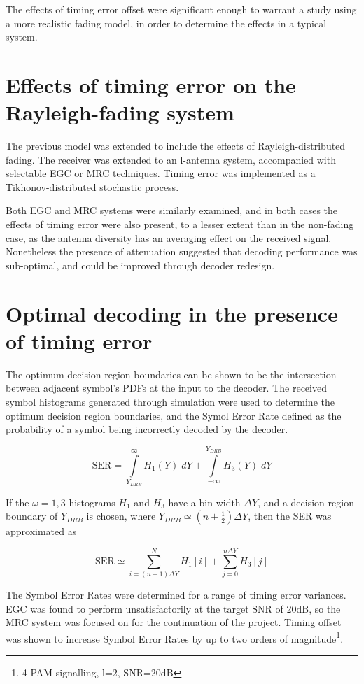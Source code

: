 The effects of timing error offset were significant enough to warrant a study using a more realistic fading model, in order to determine the effects in a typical system.

\section{Effects of timing error on the Rayleigh-fading system}

The previous model was extended to include the effects of Rayleigh-distributed fading. The receiver was extended to an l-antenna system, accompanied with selectable EGC or MRC techniques. Timing error was implemented as a Tikhonov-distributed stochastic process.

Both EGC and MRC systems were similarly examined, and in both cases the effects of timing error were also present, to a lesser extent than in the non-fading case, as the antenna diversity has an averaging effect on the received signal. Nonetheless the presence of attenuation suggested that decoding performance was sub-optimal, and could be improved through decoder redesign.

\section{Optimal decoding in the presence of timing error}

The optimum decision region boundaries can be shown to be the intersection between adjacent symbol's PDFs at the input to the decoder. The received symbol histograms generated through simulation were used to determine the optimum decision region boundaries, and the Symol Error Rate defined as the probability of a symbol being incorrectly decoded by the decoder.

\[
\text{SER} = \int\limits_{Y_{DRB}}^{\infty} H_1 (Y) \; dY + \int\limits_{- \infty}^{Y_{DRB}} H_3 (Y) \; dY
\]

If the $\omega = 1, 3$ histograms $H_1$ and $H_3$ have a bin width $\Delta Y$, and a decision region boundary of $Y_{DRB}$ is chosen, where $Y_{DRB} \simeq (n + \frac{1}{2}) \Delta Y$, then the SER was approximated as

\[
\text{SER} \simeq \sum\limits_{i = (n+1) \Delta Y}^{N} H_1 [i] + \sum\limits_{j = 0}^{n \Delta Y} H_3 [j]
\]

The Symbol Error Rates were determined for a range of timing error variances. EGC was found to perform unsatisfactorily at the target SNR of 20dB, so the MRC system was focused on for the continuation of the project.  Timing offset was shown to increase Symbol Error Rates by up to two orders of magnitude\footnote{4-PAM signalling, l=2, SNR=20dB}.

